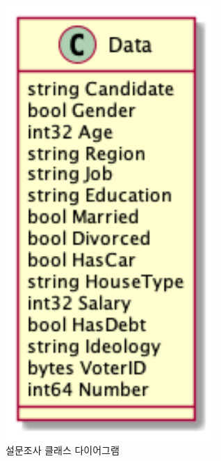 \documentclass[10pt,a4paper,left=15mm,right=15mm,top=20mm,bottom=20mm]{article}
\begin{document}
    \begin{figure}[h]
        \begin{center}
            \includegraphics[width=8cm]{survey-class}
            \caption{설문조사 클래스 다이어그램}
        \end{center}
    \end{figure}
\end{document}
